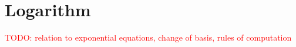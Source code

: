 \section*{Logarithm}
\textcolor{red}{TODO: relation to exponential equations, change of basis, rules of computation}